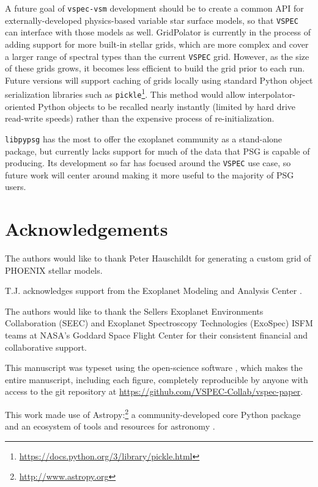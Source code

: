 \documentclass[linenumbers,5p,twocolumn,authoryear]{elsarticle}
\newcommand{\vspec}[1]{\texttt{VSPEC}#1}
\begin{document}
A future goal of \texttt{vspec-vsm} development should be to create a common API for externally-developed physics-based variable star surface models, so that \vspec{} can interface with those models as well. GridPolator is currently in the process of adding support for more built-in stellar grids, which are more complex and cover a larger range of spectral types than the current \vspec{} grid. However, as the size of these grids grows, it becomes less efficient to build the grid prior to each run. Future versions will support caching of grids locally using standard Python object serialization libraries such as \texttt{pickle}\footnote{\url{https://docs.python.org/3/library/pickle.html}}. This method would allow interpolator-oriented Python objects to be recalled nearly instantly (limited by hard drive read-write speeds) rather than the expensive process of re-initialization.

\texttt{libpypsg} has the most to offer the exoplanet community as a stand-alone package, but currently lacks support for much of the data that PSG is capable of producing. Its development so far has focused around the \vspec{} use case, so future work will center around making it more useful to the majority of PSG users.


\section{Acknowledgements}
The authors would like to thank Peter Hauschildt for generating a custom grid of PHOENIX stellar models.

T.J. acknowledges support from the Exoplanet Modeling and Analysis Center \citep[EMAC, ][]{renaud2022}.

The authors would like to thank the Sellers Exoplanet Environments Collaboration (SEEC) and Exoplanet Spectroscopy Technologies (ExoSpec) ISFM teams at NASA's Goddard Space Flight Center for their consistent financial and collaborative support.

This manuscript was typeset using the open-science software \showyourwork, which makes the entire manuscript, including each figure, completely reproducible by anyone with access to the git repository at \url{https://github.com/VSPEC-Collab/vspec-paper}.

This work made use of Astropy:\footnote{\url{http://www.astropy.org}} a community-developed core Python package and an ecosystem of tools and resources for astronomy \citep{astropycollaboration2013,astropycollaboration2018,astropycollaboration2022}.
\end{document}
